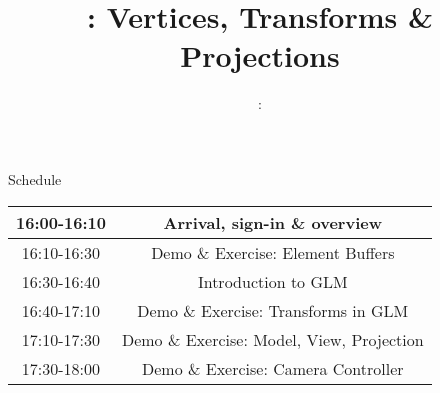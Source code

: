 \usepackage{../../beamerthemeFalmouthGamesAcademy}
\usepackage{multimedia}
\graphicspath{ {../../} }




\usepackage[normalem]{ulem}
\usepackage{wasysym}

\usepackage{pdfpages}

\usetikzlibrary{arrows,automata}




\title{\sessionnumber: Vertices, Transforms \& Projections}
\subtitle{\modulecode: \moduletitle}

\frame{\titlepage} 





\begin{frame}{Schedule}
	\begin{center}
		\begin{tabular}{|c c|}
			\hline
			16:00-16:10 & Arrival, sign-in \& overview \\
			\hline
			16:10-16:30 & Demo \& Exercise: Element Buffers \\
			\hline
			16:30-16:40 & Introduction to GLM\\
			16:40-17:10 & Demo \& Exercise: Transforms in GLM \\
			\hline
			17:10-17:30 & Demo \& Exercise: Model, View, Projection \\
			\hline
			17:30-18:00 & Demo \& Exercise: Camera Controller \\
			\hline
		\end{tabular}
	\end{center}
\end{frame}






